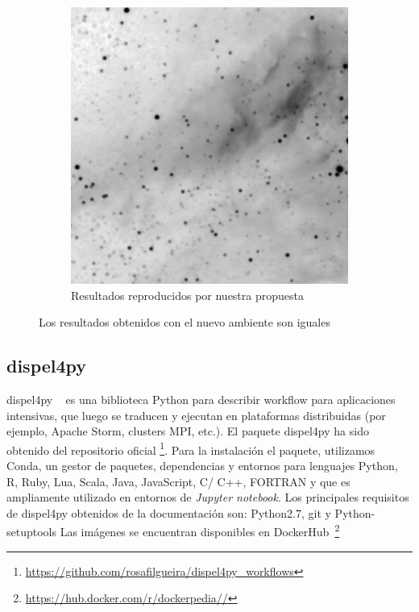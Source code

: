 \begin{figure}[t]
\begin{subfigure}[b]{0.4\textwidth}
         \includegraphics[width=\textwidth]{Figures/montage-mosorio}
         \caption[Resultados workflow reproducidos: Montage]{Resultados reproducidos por nuestra propuesta}
         \label{fig:montage-mosorio}
     \end{subfigure}
        \caption[Comparación resultados Montage]{Los resultados obtenidos con el nuevo ambiente son iguales}
        \label{fig:montage-results}
\end{figure}



\subsection{dispel4py}

dispel4py ~\cite{DBLP:conf/eScience/FilgueiraKAKSS15} es una biblioteca Python para describir workflow para aplicaciones intensivas, que luego se traducen y ejecutan en plataformas distribuidas (por ejemplo, Apache Storm, clusters MPI, etc.).
El paquete dispel4py ha sido obtenido del repositorio oficial \footnote{\url{https://github.com/rosafilgueira/dispel4py_workflows}}. 
Para la instalación el paquete, utilizamos Conda, un gestor de paquetes, dependencias y entornos para lenguajes Python, R, Ruby, Lua, Scala, Java, JavaScript, C/ C++, FORTRAN y que es ampliamente utilizado en entornos de \textit{Jupyter notebook}. 
Los principales requisitos de dispel4py obtenidos de la documentación son: Python2.7, git y  Python-setuptools
Las imágenes se encuentran disponibles en DockerHub~\footnote{\url{https://hub.docker.com/r/dockerpedia//}}



